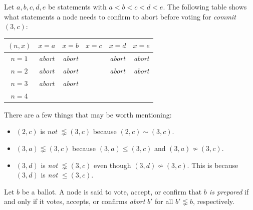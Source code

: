 \begin{exmp}
    Let $a, b, c, d, e$ be statements with $a < b < c < d < e$.
    The following table shows what statements a node needs to confirm to abort before voting for \textit{commit} $(3, c)$:
    \begin{center}
        \begin{tabular}{|c|c|c|c|c|c|}
            \hline
            $(n, x)$ & $x = a$                           & $x = b$                           & $x = c$ & $x = d$                           & $x = e$                           \\ \hline
            $n = 1$  & \cellcolor{blue!25}\textit{abort} & \cellcolor{blue!25}\textit{abort} &         & \cellcolor{blue!25}\textit{abort} & \cellcolor{blue!25}\textit{abort} \\ \hline
            $n = 2$  & \cellcolor{blue!25}\textit{abort} & \cellcolor{blue!25}\textit{abort} &         & \cellcolor{blue!25}\textit{abort} & \cellcolor{blue!25}\textit{abort} \\ \hline
            $n = 3$  & \cellcolor{blue!25}\textit{abort} & \cellcolor{blue!25}\textit{abort} &         &                                   &                                   \\ \hline
            $n = 4$  &                                   &                                   &         &                                   &                                   \\ \hline
        \end{tabular}
    \end{center}

    There are a few things that may be worth mentioning:
    \begin{itemize}
        \item
            $(2, c)$ is \textit{not} $\lnsim (3, c)$ because $(2, c) \sim (3, c)$.
        \item
            $(3, a) \lnsim (3, c)$ because $(3, a) \leq (3, c)$ and $(3, a) \nsim (3, c)$.
        \item
            $(3, d)$ is \textit{not} $\lnsim (3, c)$ even though $(3, d) \nsim (3, c)$.
            This is because $(3, d)$ is \textit{not} $\leq (3, c)$.
    \end{itemize}
\end{exmp}

\begin{defn}[Prepare]
    Let $b$ be a ballot.
    A node is said to vote, accept, or confirm that \textit{$b$ is prepared} if and only if it votes, accepts, or confirms \textit{abort} $b'$ for all $b' \lnsim b$, respectively.
\end{defn}

